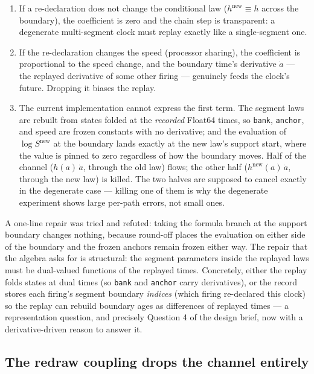 \documentclass[11pt]{article}
\newcommand{\code}[1]{\texttt{#1}}
\begin{document}
\begin{enumerate}
\item If a re-declaration does not change the conditional law
  ($h^{\mathrm{new}} \equiv h$ across the boundary), the coefficient is
  zero and the chain step is transparent: a degenerate multi-segment
  clock must replay exactly like a single-segment one.
\item If the re-declaration changes the speed (processor sharing), the
  coefficient is proportional to the speed change, and the boundary
  time's derivative $\dot a$ --- the replayed derivative of some other
  firing --- genuinely feeds the clock's future. Dropping it biases the
  replay.
\item The current implementation cannot express the first term. The
  segment laws are rebuilt from states folded at the \emph{recorded}
  Float64 times, so \code{bank}, \code{anchor}, and speed are frozen
  constants with no derivative; and the evaluation of
  $\log S^{\mathrm{new}}$ at the boundary lands exactly at the new law's
  support start, where the value is pinned to zero regardless of how the
  boundary moves. Half of the channel ($h(a)\,\dot a$, through the old
  law) flows; the other half ($h^{\mathrm{new}}(a)\,\dot a$, through the
  new law) is killed. The two halves are supposed to cancel exactly in
  the degenerate case --- killing one of them is why the degenerate
  experiment shows large per-path errors, not small ones.
\end{enumerate}

A one-line repair was tried and refuted: taking the formula branch at
the support boundary changes nothing, because round-off places the
evaluation on either side of the boundary and the frozen anchors remain
frozen either way. The repair that the algebra asks for is structural:
the segment parameters inside the replayed laws must be dual-valued
functions of the replayed times. Concretely, either the replay folds
states at dual times (so \code{bank} and \code{anchor} carry
derivatives), or the record stores each firing's segment boundary
\emph{indices} (which firing re-declared this clock) so the replay can
rebuild boundary ages as differences of replayed times --- a
representation question, and precisely Question 4 of the design brief,
now with a derivative-driven reason to answer it.

\subsection{The redraw coupling drops the channel entirely}
\end{document}
